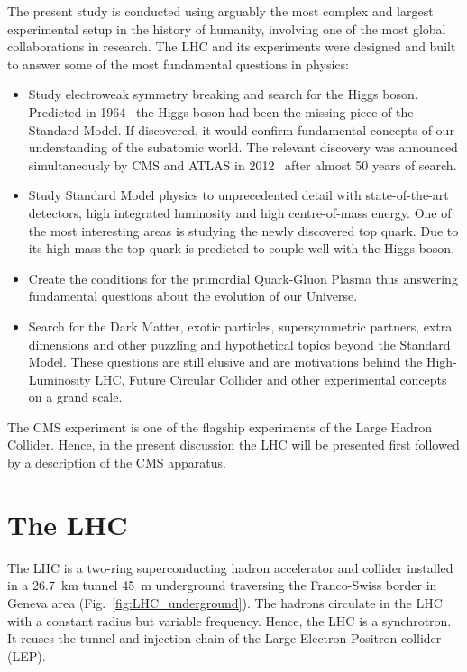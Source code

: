 The present study is conducted using arguably the most complex and largest experimental setup in the history of humanity, involving one of the most global collaborations in research. The LHC and its experiments were designed and built to answer some of the most fundamental questions in physics:

\begin{itemize}
\item Study electroweak symmetry breaking and search for the Higgs boson. Predicted in 1964~\cite{Higgs:1964ia} \cite{Englert:1964et} the Higgs boson had been the missing piece of the Standard Model. If discovered, it would confirm fundamental concepts of our understanding of the subatomic world. The relevant discovery was announced simultaneously by CMS and ATLAS in 2012~\cite{Chatrchyan:2012xdj} \cite{Aad:2012tfa} after almost 50 years of search.
\item Study Standard Model physics to unprecedented detail with state-of-the-art detectors, high integrated luminosity and high centre-of-mass energy. One of the most interesting areas is studying the newly discovered top quark. Due to its high mass the top quark is predicted to couple well with the Higgs boson.
\item Create the conditions for the primordial Quark-Gluon Plasma thus answering fundamental questions about the evolution of our Universe.
\item Search for the Dark Matter, exotic particles, supersymmetric partners, extra dimensions and other puzzling and hypothetical topics beyond the Standard Model. These questions are still elusive and are motivations behind the High-Luminosity LHC, Future Circular Collider and other experimental concepts on a grand scale.
\end {itemize}

The CMS experiment is one of the flagship experiments of the Large Hadron Collider. Hence, in the present discussion the LHC will be presented first followed by a description of the CMS apparatus.

\section{The LHC}

The LHC is a two-ring superconducting hadron accelerator and collider installed in a 26.7~km tunnel 45~m underground traversing the Franco-Swiss border in Geneva area (Fig.~\ref{fig:LHC_underground}). The hadrons circulate in the LHC with a constant radius but variable frequency. Hence, the LHC is a synchrotron. It reuses the tunnel and injection chain of the Large Electron-Positron collider (LEP).


